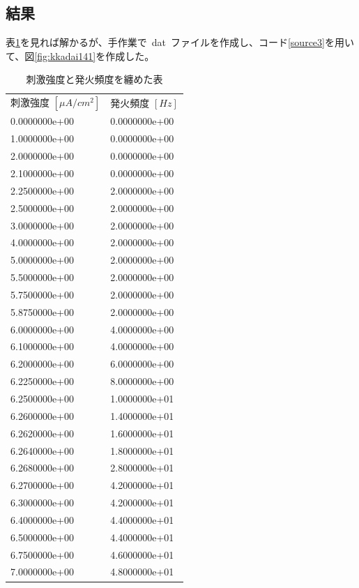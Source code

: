 \documentclass[10pt]{jarticle}
\begin{document}
\subsection{結果}
%
表\ref{table:kkadai141}を見れば解かるが、手作業で\ dat\ ファイルを作成し、コード\ref{source3}を用いて、図\ref{fig:kkadai141}を作成した。
\clearpage
\begin{table}[htbp]
	\centering
	\caption{刺激強度と発火頻度を纏めた表}
	\label{table:kkadai141}
	\begin{tabular}{|l|l|}
		刺激強度 $ [\mu A / cm^2] $ & 発火頻度 $ [Hz] $\\
		0.0000000e+00 & 0.0000000e+00 \\
		1.0000000e+00 & 0.0000000e+00 \\
		2.0000000e+00 & 0.0000000e+00 \\
		2.1000000e+00 & 0.0000000e+00 \\
		2.2500000e+00 & 2.0000000e+00 \\
		2.5000000e+00 & 2.0000000e+00 \\
		3.0000000e+00 & 2.0000000e+00 \\
		4.0000000e+00 & 2.0000000e+00 \\
		5.0000000e+00 & 2.0000000e+00 \\
		5.5000000e+00 & 2.0000000e+00 \\
		5.7500000e+00 & 2.0000000e+00 \\
		5.8750000e+00 & 2.0000000e+00 \\
		6.0000000e+00 & 4.0000000e+00 \\
		6.1000000e+00 & 4.0000000e+00 \\
		6.2000000e+00 & 6.0000000e+00 \\
		6.2250000e+00 & 8.0000000e+00 \\
		6.2500000e+00 & 1.0000000e+01 \\
		6.2600000e+00 & 1.4000000e+01 \\
		6.2620000e+00 & 1.6000000e+01 \\
		6.2640000e+00 & 1.8000000e+01 \\
		6.2680000e+00 & 2.8000000e+01 \\
		6.2700000e+00 & 4.2000000e+01 \\
		6.3000000e+00 & 4.2000000e+01 \\
		6.4000000e+00 & 4.4000000e+01 \\
		6.5000000e+00 & 4.4000000e+01 \\
		6.7500000e+00 & 4.6000000e+01 \\
		7.0000000e+00 & 4.8000000e+01 \\

\end{tabular}
\end{table}
\end{document}
